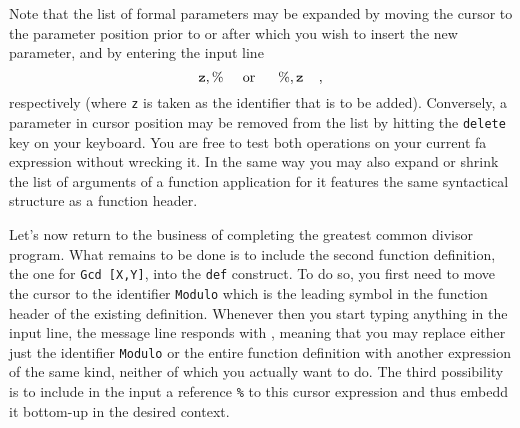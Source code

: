 Note that the list of formal parameters may be {\mys expanded} by moving the 
cursor to the parameter position prior to or
after which you wish to insert the new parameter, and by entering
 the input line
$$
 {\tt z,\%}\;\;\;\;\; {\rm or}\;\;\;\;\;\; {\tt \%, z}\;\;\;\;                         ,
$$
 respectively
 (where {\tt z} is taken as the identifier
that is to be added). Conversely, a parameter in cursor position may be {\mys removed}
from the list 
by hitting the {\tt delete} key on your keyboard. You are free to test both
operations on
your current {\sc fa} expression without wrecking it. In the same way you
 may also {\mys expand} or {\mys shrink} the list of
arguments of a function application for it features the same syntactical
structure as a function header. 


Let's now return to the business of completing the greatest common divisor 
program.  What remains to be done is
 to include the second function definition, the one
for {\tt Gcd [X,Y]}, into the {\tt def} construct. 
To do so, you first need to move the cursor to the identifier
{\tt Modulo} which is the leading symbol in the function header of the existing definition.
Whenever then you start typing anything in the input
line, the message line responds with {\tt <var| fdec>}, meaning that you
may replace either just the identifier {\tt Modulo} or the
entire function definition with another expression of the same kind,
neither of which you actually want to do. The third possibility is to
include in the input a {\mys reference} {\tt \%} to this cursor expression
 and thus embedd it bottom-up in the desired context. 

